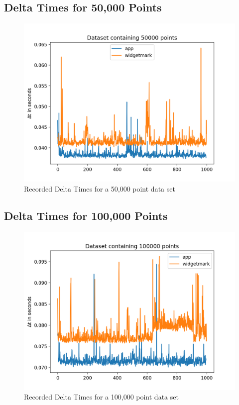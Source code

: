 \clearpage


\subsection{Delta Times for 50,000 Points}

\begin{figure}[h]
    \centering
    \includegraphics[width=14cm]{resources/img/evaluation/Eval_50000}
    \caption{
        Recorded Delta Times for a 50,000 point data set
    }
    \label{a:tab:evaluation:50000}
\end{figure}

\clearpage


\subsection{Delta Times for 100,000 Points}

\begin{figure}[h]
    \centering
    \includegraphics[width=14cm]{resources/img/evaluation/Eval_100000}
    \caption{
        Recorded Delta Times for a 100,000 point data set
    }
    \label{a:tab:evaluation:100000}
\end{figure}


